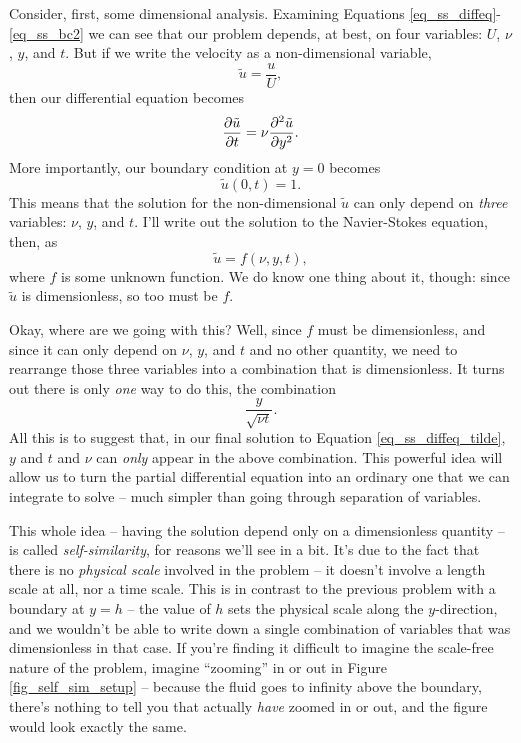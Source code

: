 Consider, first, some dimensional analysis.  Examining Equations \ref{eq_ss_diffeq}-\ref{eq_ss_bc2} we can see that our problem depends, at best, on four variables: $U$, $\nu$, $y$, and $t$.  But if we write the velocity as a non-dimensional variable,
\[
\tilde{u} = \frac{u}{U},
\]
then our differential equation becomes
\begin{equation}
\label{eq_ss_diffeq_tilde}
\frac{\partial {\tilde{u}}}{\partial {t}} = \nu \frac{\partial^2 {\tilde{u}}}{\partial {y}^2}.
\end{equation}
More importantly, our boundary condition at $y=0$ becomes
\[
\tilde{u}(0, t) = 1.
\]
This means that the solution for the non-dimensional $\tilde{u}$ can only depend on \emph{three} variables:  $\nu$, $y$, and $t$.  I'll write out the solution to the Navier-Stokes equation, then, as
\[
\tilde{u} = f(\nu, y, t),
\]
where $f$ is some unknown function.  We do know one thing about it, though:  since $\tilde{u}$ is dimensionless, so too must be $f$.

Okay, where are we going with this?  Well, since $f$ must be dimensionless, and since it can only depend on $\nu$, $y$, and $t$ and no other quantity, we need to rearrange those three variables into a combination that is dimensionless.  It turns out there is only \emph{one} way to do this, the combination
\[
\frac{y}{\sqrt{\nu t}}.
\]
All this is to suggest that, in our final solution to Equation \ref{eq_ss_diffeq_tilde}, $y$ and $t$ and $\nu$ can \emph{only} appear in the above combination.  This powerful idea will allow us to turn the partial differential equation into an ordinary one that we can integrate to solve -- much simpler than going through separation of variables.

This whole idea -- having the solution depend only on a dimensionless quantity -- is called \emph{self-similarity}, for reasons we'll see in a bit.  It's due to the fact that there is no \emph{physical scale} involved in the problem -- it doesn't involve a length scale at all, nor a time scale.  This is in contrast to the previous problem with a boundary at $y=h$ -- the value of $h$ sets the physical scale along the $y$-direction, and we wouldn't be able to write down a single combination of variables that was dimensionless in that case.  If you're finding it difficult to imagine the scale-free nature of the problem, imagine ``zooming'' in or out in Figure \ref{fig_self_sim_setup} -- because the fluid goes to infinity above the boundary, there's nothing to tell you that actually \emph{have} zoomed in or out, and the figure would look exactly the same.


